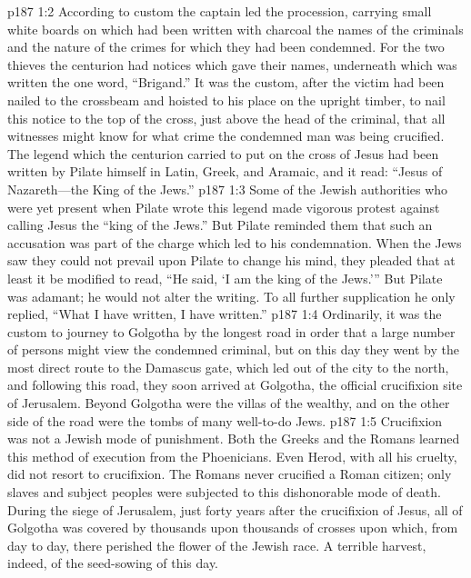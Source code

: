 \vs p187 1:2 According to custom the captain led the procession, carrying small white boards on which had been written with charcoal the names of the criminals and the nature of the crimes for which they had been condemned. For the two thieves the centurion had notices which gave their names, underneath which was written the one word, “Brigand.” It was the custom, after the victim had been nailed to the crossbeam and hoisted to his place on the upright timber, to nail this notice to the top of the cross, just above the head of the criminal, that all witnesses might know for what crime the condemned man was being crucified. The legend which the centurion carried to put on the cross of Jesus had been written by Pilate himself in Latin, Greek, and Aramaic, and it read: “Jesus of Nazareth---the King of the Jews.”
\vs p187 1:3 Some of the Jewish authorities who were yet present when Pilate wrote this legend made vigorous protest against calling Jesus the “king of the Jews.” But Pilate reminded them that such an accusation was part of the charge which led to his condemnation. When the Jews saw they could not prevail upon Pilate to change his mind, they pleaded that at least it be modified to read, “He said, ‘I am the king of the Jews.’” But Pilate was adamant; he would not alter the writing. To all further supplication he only replied, “What I have written, I have written.”
\vs p187 1:4 Ordinarily, it was the custom to journey to Golgotha by the longest road in order that a large number of persons might view the condemned criminal, but on this day they went by the most direct route to the Damascus gate, which led out of the city to the north, and following this road, they soon arrived at Golgotha, the official crucifixion site of Jerusalem. Beyond Golgotha were the villas of the wealthy, and on the other side of the road were the tombs of many well\hyp{}to\hyp{}do Jews.
\pc \vs p187 1:5 Crucifixion was not a Jewish mode of punishment. Both the Greeks and the Romans learned this method of execution from the Phoenicians. Even Herod, with all his cruelty, did not resort to crucifixion. The Romans never crucified a Roman citizen; only slaves and subject peoples were subjected to this dishonorable mode of death. During the siege of Jerusalem, just forty years after the crucifixion of Jesus, all of Golgotha was covered by thousands upon thousands of crosses upon which, from day to day, there perished the flower of the Jewish race. A terrible harvest, indeed, of the seed\hyp{}sowing of this day.
